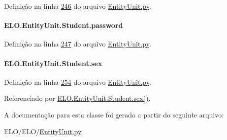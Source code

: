 Definição na linha \hyperlink{EntityUnit_8py_source_l00246}{246} do arquivo \hyperlink{EntityUnit_8py_source}{Entity\-Unit.\-py}.

\hypertarget{classELO_1_1EntityUnit_1_1Student_a834cad492221bfe3f26e590666e13f9a}{
\paragraph[{password}]{\setlength{\rightskip}{0pt plus 5cm}E\-L\-O.\-Entity\-Unit.\-Student.\-password}}\label{classELO_1_1EntityUnit_1_1Student_a834cad492221bfe3f26e590666e13f9a}


Definição na linha \hyperlink{EntityUnit_8py_source_l00247}{247} do arquivo \hyperlink{EntityUnit_8py_source}{Entity\-Unit.\-py}.

\hypertarget{classELO_1_1EntityUnit_1_1Student_a5ca85c1d00044512e5dc3cfabac4ff9f}{
\paragraph[{sex}]{\setlength{\rightskip}{0pt plus 5cm}E\-L\-O.\-Entity\-Unit.\-Student.\-sex}}\label{classELO_1_1EntityUnit_1_1Student_a5ca85c1d00044512e5dc3cfabac4ff9f}


Definição na linha \hyperlink{EntityUnit_8py_source_l00254}{254} do arquivo \hyperlink{EntityUnit_8py_source}{Entity\-Unit.\-py}.



Referenciado por \hyperlink{classELO_1_1EntityUnit_1_1Student_a358998b764eed85c81244ee43792f762}{E\-L\-O.\-Entity\-Unit.\-Student.\-sex()}.



A documentação para esta classe foi gerada a partir do seguinte arquivo\-:\begin{DoxyCompactItemize}
\item 
E\-L\-O/\-E\-L\-O/\hyperlink{EntityUnit_8py}{Entity\-Unit.\-py}\end{DoxyCompactItemize}
